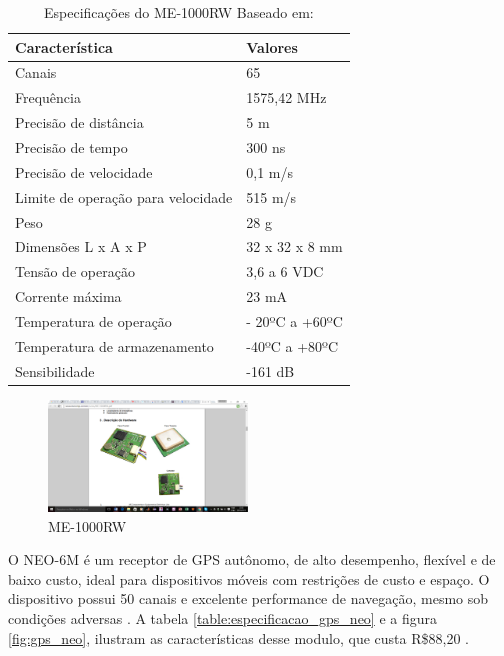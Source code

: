 \begin{table}[ht]
\caption{Especificações do ME-1000RW Baseado em: \cite{11gps}}
\centering
\begin{tabular}{| l |  p{5cm} |}
\hline
Característica & Valores \\
\hline
Canais & 65 \\
\hline
Frequência & 1575,42 MHz \\
\hline
Precisão de distância & 5 m \\
\hline
Precisão de tempo & 300 ns \\
\hline
Precisão de velocidade & 0,1 m/s \\
\hline
Limite de operação para velocidade & 515 m/s \\
\hline
Peso & 28 g \\
\hline
Dimensões L x A x P & 32 x 32 x 8 mm \\
\hline
Tensão de operação & 3,6 a 6 VDC \\
\hline
Corrente máxima & 23 mA \\
\hline
Temperatura de operação & - 20ºC a +60ºC \\
\hline
Temperatura de armazenamento & -40ºC a +80ºC \\
\hline
Sensibilidade & -161 dB \\
\hline
\end{tabular}
\label{table:especificacao_gps_me1000}
\end{table}


\begin{figure}[h]
  \centering
  \includegraphics[width=200px, scale=1]{figuras/gps_me1000}
  \caption{ME-1000RW \cite{11gps}}
\label{fig:gps_me1000}
\end{figure}


O NEO-6M é um receptor de GPS autônomo, de alto desempenho, flexível e de
baixo custo, ideal para dispositivos móveis com restrições de custo e
 espaço. O dispositivo possui 50 canais e excelente performance de navegação,
 mesmo sob condições adversas \cite{13gps}. A tabela \ref{table:especificacao_gps_neo}
  e a figura \ref{fig:gps_neo}, ilustram as
 características desse modulo, que custa R\$88,20 \cite{14gps}.



